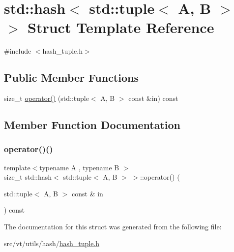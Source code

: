 \hypertarget{structstd_1_1hash_3_01std_1_1tuple_3_01_a_00_01_b_01_4_01_4}{}\section{std\+:\+:hash$<$ std\+:\+:tuple$<$ A, B $>$ $>$ Struct Template Reference}
\label{structstd_1_1hash_3_01std_1_1tuple_3_01_a_00_01_b_01_4_01_4}


{\ttfamily \#include $<$hash\+\_\+tuple.\+h$>$}

\subsection*{Public Member Functions}
\begin{DoxyCompactItemize}
\item 
size\+\_\+t \hyperlink{structstd_1_1hash_3_01std_1_1tuple_3_01_a_00_01_b_01_4_01_4_a3562c1ad6da96c278d99bff49018ae88}{operator()} (std\+::tuple$<$ A, B $>$ const \&in) const
\end{DoxyCompactItemize}


\subsection{Member Function Documentation}
\mbox{\label{structstd_1_1hash_3_01std_1_1tuple_3_01_a_00_01_b_01_4_01_4_a3562c1ad6da96c278d99bff49018ae88}} 
\subsubsection{\texorpdfstring{operator()()}{operator()()}}
{\footnotesize\ttfamily template$<$typename A , typename B $>$ \\
size\+\_\+t std\+::hash$<$ std\+::tuple$<$ A, B $>$ $>$\+::operator() (\begin{DoxyParamCaption}\item[{std\+::tuple$<$ A, B $>$ const \&}]{in }\end{DoxyParamCaption}) const\hspace{0.3cm}{\ttfamily [inline]}}



The documentation for this struct was generated from the following file\+:\begin{DoxyCompactItemize}
\item 
src/vt/utils/hash/\hyperlink{hash__tuple_8h}{hash\+\_\+tuple.\+h}\end{DoxyCompactItemize}
